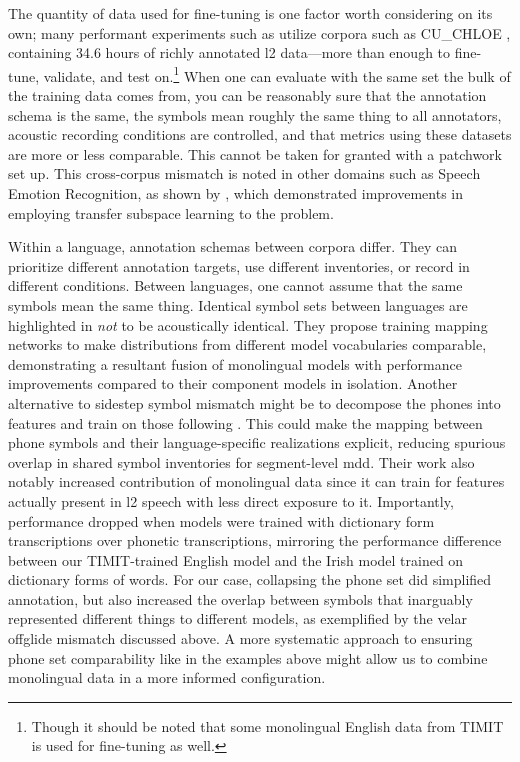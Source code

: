 \documentclass[thesis]{cluu}
\begin{document}
The quantity of data used for fine-tuning is one factor worth considering on its own; many performant experiments such as \textcite{wuTransformerBasedEndtoEnd2021} utilize corpora such as CU\_CHLOE \parencite{helenmengDerivingSalientLearnersx20192007}, containing 34.6 hours of richly annotated \gls{l2} data---more than enough to fine-tune, validate, and test on.\footnote{Though it should be noted that some monolingual English data from TIMIT is used for fine-tuning as well.} When one can evaluate with the same set the bulk of the training data comes from, you can be reasonably sure that the annotation schema is the same, the symbols mean roughly the same thing to all annotators, acoustic recording conditions are controlled, and that metrics using these datasets are more or less comparable. This cannot be taken for granted with a patchwork set up. This cross-corpus mismatch is noted in other domains such as Speech Emotion Recognition, as shown by \textcite{zongAdaptingMultipleDistributions2022}, which demonstrated improvements in employing transfer subspace learning to the problem.

Within a language, annotation schemas between corpora differ. They can prioritize different annotation targets, use different inventories, or record in different conditions. Between languages, one cannot assume that the same symbols mean the same thing. Identical symbol sets between languages are highlighted in \textcite{farooqInvestigatingImpactCrosslingual2022} \textit{not} to be acoustically identical. They propose training mapping networks to make distributions from different model vocabularies comparable, demonstrating a resultant fusion of monolingual models with performance improvements compared to their component models in isolation. Another alternative to sidestep symbol mismatch might be to decompose the phones into features and train on those following \textcite{shahinPhonologicalLevelWav2vec2based2025}. This could make the mapping between phone symbols and their language-specific realizations explicit, reducing spurious overlap in shared symbol inventories for segment-level \gls{mdd}. Their work also notably increased contribution of monolingual data since it can train for features actually present in \gls{l2} speech with less direct exposure to it. Importantly, performance dropped when models were trained with dictionary form transcriptions over phonetic transcriptions, mirroring the performance difference between our TIMIT-trained English model and the Irish model trained on dictionary forms of words. For our case, collapsing the phone set did simplified annotation, but also increased the overlap between symbols that inarguably represented different things to different models, as exemplified by the velar offglide mismatch discussed above. A more systematic approach to ensuring phone set comparability like in the examples above might allow us to combine monolingual data in a more informed configuration.
\end{document}
